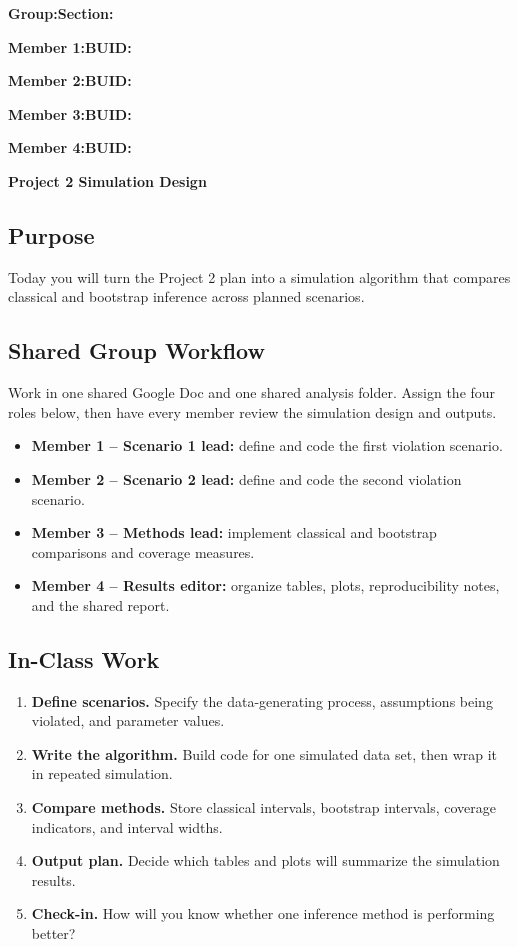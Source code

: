 \documentclass{article}
\newcommand{\projecttitle}{Project 2 Simulation Design}
\newcommand{\blankline}{\underline{\phantom{XXXXXXXXXXXXXXXXXXXXXXXX}}}
\newcommand{\blankid}{\underline{\phantom{XXXXXXXXXXXXXXX}}}
\begin{document}
\noindent\textbf{Group:}\blankline{}\hfill\textbf{Section:}\blankid{}

\medskip
\noindent\textbf{Member 1:}\blankline{}\hfill\textbf{BUID:}\blankid{}

\medskip
\noindent\textbf{Member 2:}\blankline{}\hfill\textbf{BUID:}\blankid{}

\medskip
\noindent\textbf{Member 3:}\blankline{}\hfill\textbf{BUID:}\blankid{}

\medskip
\noindent\textbf{Member 4:}\blankline{}\hfill\textbf{BUID:}\blankid{}

\begin{center}
  {\Large \textbf{\projecttitle{}}}
\end{center}

\subsection*{Purpose}
Today you will turn the Project 2 plan into a simulation algorithm that compares classical and bootstrap inference across planned scenarios.

\subsection*{Shared Group Workflow}
Work in one shared Google Doc and one shared analysis folder. Assign the four roles below, then have every member review the simulation design and outputs.
\begin{itemize}[itemsep=.25em]
  \item \textbf{Member 1 -- Scenario 1 lead:} define and code the first violation scenario.
  \item \textbf{Member 2 -- Scenario 2 lead:} define and code the second violation scenario.
  \item \textbf{Member 3 -- Methods lead:} implement classical and bootstrap comparisons and coverage measures.
  \item \textbf{Member 4 -- Results editor:} organize tables, plots, reproducibility notes, and the shared report.
\end{itemize}

\subsection*{In-Class Work}
\begin{enumerate}[label={\bfseries (\Alph*)},itemsep=.5em]
  \item \textbf{Define scenarios.} Specify the data-generating process, assumptions being violated, and parameter values.
  \item \textbf{Write the algorithm.} Build code for one simulated data set, then wrap it in repeated simulation.
  \item \textbf{Compare methods.} Store classical intervals, bootstrap intervals, coverage indicators, and interval widths.
  \item \textbf{Output plan.} Decide which tables and plots will summarize the simulation results.
  \item \textbf{Check-in.} How will you know whether one inference method is performing better?
\end{enumerate}
\end{document}

